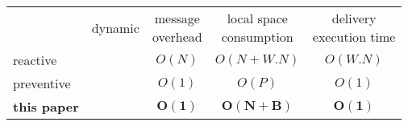 \newcommand{\cmark}{\ding{51}}%
\newcommand{\xmark}{\ding{55}}%

\setlength{\tabcolsep}{3pt} %

\begin{tabularx}{0.98\columnwidth}{@{}Xcccc@{}}
  & dynamic & \makecell{message\\overhead} & \makecell{local space\\consumption} &  \makecell{delivery\\execution time} \\ \cmidrule{2-5}
  reactive~\cite{schwarz1994detecting} & \cmark & $O(N)$ & $O(N+W.N)$ & $O(W.N)$ \\
  preventive~\cite{friedman2004causal} & \xmark & $O(1)$ & $O(P)$ & $O(1)$ \\ \hline\hline
  \textbf{this paper} & \textbf{\cmark} & $\mathbf{O(1)}$ & $\mathbf{O(N+B)}$ & $\mathbf{O(1)}$ \\ 
\end{tabularx}

